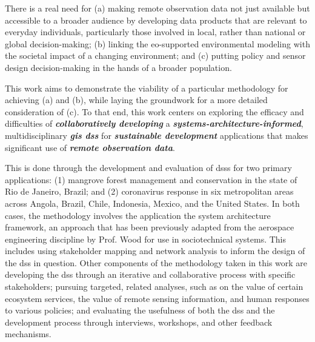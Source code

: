 \documentclass[notitlepage]{article}
\begin{document}
There is a real need for (a) making remote observation data not just available but accessible to a broader audience by developing data products that are relevant to everyday individuals, particularly those involved in local, rather than national or global decision-making; (b) linking the \ac{eo}-supported environmental modeling with the societal impact of a changing environment; and (c) putting policy and sensor design decision-making in the hands of a broader population. 

This work aims to demonstrate the viability of a particular methodology for achieving (a) and (b), while laying the groundwork for a more detailed consideration of (c). To that end, this work centers on exploring the efficacy and difficulties of \textbf{\textit{collaboratively developing}} a \textbf{\textit{systems-architecture-informed}}, multidisciplinary \textbf{\textit{\ac{gis} \ac{dss}}} for \textbf{\textit{sustainable development}} applications that makes significant use of \textbf{\textit{remote observation data}}. 

This is done through the development and evaluation of \acp{dss} for two primary applications: (1) mangrove forest management and conservation in the state of Rio de Janeiro, Brazil; and (2) coronavirus response in six metropolitan areas across Angola, Brazil, Chile, Indonesia, Mexico, and the United States. In both cases, the methodology involves the application the system architecture framework, an approach that has been previously adapted from the aerospace engineering discipline by Prof. Wood for use in sociotechnical systems. This includes using stakeholder mapping and network analysis to inform the design of the \ac{dss} in question. Other components of the methodology taken in this work are developing the \ac{dss} through an iterative and collaborative process with specific stakeholders; pursuing targeted, related analyses, such as on the value of certain ecosystem services, the value of remote sensing information, and human responses to various policies; and evaluating the usefulness of both the \ac{dss} and the development process through interviews, workshops, and other feedback mechanisms.
\end{document}
